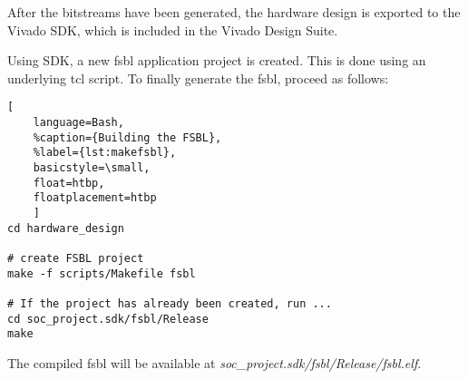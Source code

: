 After the bitstreams have been generated, the hardware design is exported to the Vivado SDK, which is included in the Vivado Design Suite.

Using SDK, a new \gls{fsbl} application project is created. This is done using an underlying \gls{tcl} script. To finally generate the \gls{fsbl}, proceed as follows:
\begin{lstlisting}[
	language=Bash,
	%caption={Building the FSBL},
	%label={lst:makefsbl},
	basicstyle=\small,
	float=htbp,
	floatplacement=htbp
	]
cd hardware_design

# create FSBL project
make -f scripts/Makefile fsbl

# If the project has already been created, run ...
cd soc_project.sdk/fsbl/Release
make
\end{lstlisting}

The compiled \gls{fsbl} will be available at \emph{soc_project.sdk/fsbl/Release/fsbl.elf}.